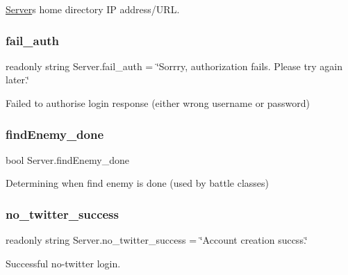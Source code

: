 \mbox{\hyperlink{class_server}{Server}}\textquotesingle{}s home directory IP address/\+U\+RL. 

\mbox{\label{class_server_ab625c993d6d1ab40721d3ca33af00cb8}} 
\subsubsection{\texorpdfstring{fail\_auth}{fail\_auth}}
{\footnotesize\ttfamily readonly string Server.\+fail\+\_\+auth = \char`\"{}Sorrry, authorization fails. Please try again later.\char`\"{}\hspace{0.3cm}{\ttfamily [static]}}



Failed to authorise login response (either wrong username or password) 

\mbox{\label{class_server_a914251970cab3255c343d60a6a7a55f5}} 
\subsubsection{\texorpdfstring{findEnemy\_done}{findEnemy\_done}}
{\footnotesize\ttfamily bool Server.\+find\+Enemy\+\_\+done\hspace{0.3cm}{\ttfamily [static]}}



Determining when find enemy is done (used by battle classes) 

\mbox{\label{class_server_a68768a2b0fbd0595e8690908bf8bb66b}} 
\subsubsection{\texorpdfstring{no\_twitter\_success}{no\_twitter\_success}}
{\footnotesize\ttfamily readonly string Server.\+no\+\_\+twitter\+\_\+success = \char`\"{}Account creation succss.\char`\"{}\hspace{0.3cm}{\ttfamily [static]}}



Successful no-\/twitter login. 

